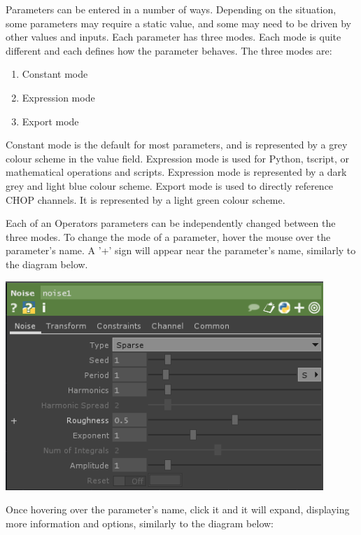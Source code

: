 \begin{fullwidth}

Parameters can be entered in a number of ways. Depending on the situation, some parameters may require a static value, and some may need to be driven by other values and inputs. Each parameter has three modes. Each mode is quite different and each defines how the parameter behaves. The three modes are:

\begin{enumerate}
\item Constant mode
\item Expression mode
\item Export mode
\end{enumerate}

Constant mode is the default for most parameters, and is represented by a grey colour scheme in the value field. Expression mode is used for Python, tscript, or mathematical operations and scripts. Expression mode is represented by a dark grey and light blue colour scheme. Export mode is used to directly reference CHOP channels.  It is represented by a light green colour scheme.

Each of an Operators parameters can be independently changed between the three modes. To change the mode of a parameter, hover the mouse over the parameter's name. A '+' sign will appear near the parameter's name, similarly to the diagram below.

\begin{center}
\includegraphics[width=12cm]{./img/2.2/parameters-1.PNG}
\end{center}

Once hovering over the parameter's name, click it and it will expand, displaying more information and options, similarly to the diagram below:


\end{fullwidth}
